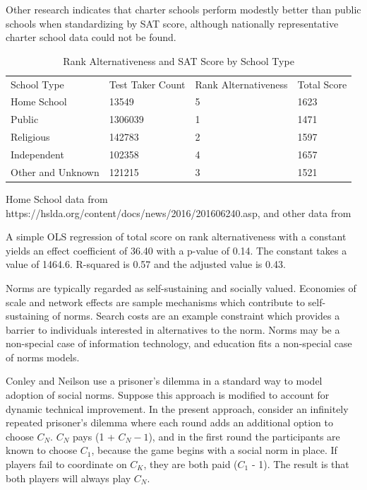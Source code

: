 \documentclass[AER]{./aea-latex-templates/AEA}
\begin{document}
Other research indicates that charter schools\cite{di2011evidence} perform modestly better than
public schools when standardizing by SAT score, although nationally
representative charter school data could not be found.

\begin{table}
\caption{Rank Alternativeness and SAT Score by School Type}
\begin{tabular}{llll}
School Type & Test Taker Count & Rank Alternativeness & Total Score \\
Home School & 13549 & 5 & 1623 \\
Public & 1306039 & 1 & 1471 \\
Religious & 142783 & 2 & 1597 \\
Independent & 102358 & 4 & 1657 \\
Other and Unknown & 121215 & 3 & 1521 %
\end{tabular}
\begin{tablenotes}[Source]
Home School data from https://hslda.org/content/docs/news/2016/201606240.asp,
and other data from \cite{collegeboard_2014} %
\end{tablenotes}
\label{tab:rank_alt_and_sat_by_school_type}
\end{table}

A simple OLS regression of total score on rank alternativeness with a
constant yields an effect coefficient of 36.40 with a p-value of 0.14. The
constant takes a value of 1464.6. R-squared is 0.57 and the adjusted value
is 0.43.

Norms are typically regarded as self-sustaining and socially
valued\cite{dequech2006institutions}. Economies of scale and
network effects are sample mechanisms which contribute to
self-sustaining of norms. Search costs are an example constraint
which provides a barrier to individuals interested in alternatives
to the norm. Norms may be a non-special case of
information technology, and education fits a non-special case of norms models.

Conley and Neilson use a prisoner’s dilemma in a standard way to model adoption
of social norms\cite{conley2009endogenous}. Suppose this approach is modified
to account for dynamic technical improvement. In the present
approach, consider an infinitely repeated prisoner’s dilemma where each
round adds an additional option to choose $C_N$. $C_N$ pays
(1 + $C_N-1$), and in the first round the participants are known to
choose $C_1$, because the game begins with a social norm in place.
If players fail to coordinate on $C_K$, they are both paid ($C_1$ - 1).
The result is that both players will always play $C_N$.
\end{document}
